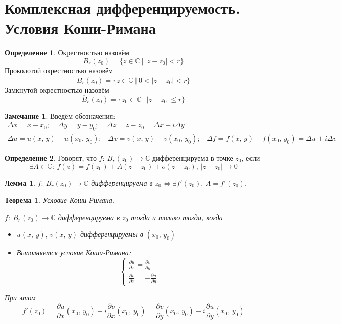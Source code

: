 \documentclass[a4paper,12pt]{article}
\renewcommand{\leq}{\ensuremath{\leqslant}}
\theoremstyle{plain}
\newtheorem{theorem}{Теорема}[section]
\newtheorem{lemma}{Лемма}[section]
\theoremstyle{definition}
\newtheorem{definition}{Определение}[section]
\newtheorem*{note}{Замечание}
\theoremstyle{remark}
\begin{document}
\tableofcontents
\newpage

\section{Комплексная дифференцируемость. Условия Коши-Римана}
\begin{definition}
	Окрестностью назовём
	\[
		B_r(z_0) = \{z \in \mathbb{C} \:\vert\: \vert z - z_0\vert < r\}
	\]
	Проколотой окрестностью назовём
	\[
		\dot{B}_r(z_0) = \{z \in \mathbb{C} \:\vert\: 0 < \vert z - z_0\vert < r\}
	\]
	Замкнутой окрестностью назовём
	\[
		\overline{B}_r(z_0) = \{z_0 \in \mathbb{C} \:\vert\: \vert z - z_0\vert \leq r\}
	\]
\end{definition}

\begin{note}
	Введём обозначения:
	\begin{align*}
		\Delta x = x - x_0 ;\;\;\;\; \Delta y = y - y_0 ;\;\;\;\; \Delta z = z - z_0 = \Delta x + i\Delta y \\
		\Delta u = u(x,\,y) - u(x_0,\,y_0);\;\;\; \Delta v = v(x,\,y) - v(x_0,\, y_0) ;\;\;\; \Delta f = f(x,\, y) - f(x_0,\, y_0) = \Delta u + i\Delta v
	\end{align*}
\end{note}

\begin{definition}
	Говорят, что $f :\: B_r(z_0) \to \mathbb{C}$ дифференцируема в точке $z_0$, если
	\[
		\exists A \in \mathbb{C} :\: f(z) = f(z_0) + A(z - z_0) + o(z - z_0),\, \vert z - z_0\vert \to 0
	\]
\end{definition}

\begin{lemma}
	$f :\: B_r(z_0) \to \mathbb{C}$ дифференцируема в $z_0 \Leftrightarrow \exists f'(z_0),\, A = f'(z_0)$.
\end{lemma}

\begin{theorem}
	Условие Коши-Римана.

	$f :\: B_r(z_0) \to \mathbb{C}$ дифференцируема в $z_0$ тогда и только тогда, когда
	\begin{itemize}
		\item $u(x,\, y),\, v(x,\, y)$ дифференцируемы в $(x_0,\, y_0)$
		\item Выполняется условие Коши-Римана:
		      \[
			      \begin{cases}
				      \frac{\partial u}{\partial x} = \frac{\partial v}{\partial y} \\
				      \frac{\partial v}{\partial x} = -\frac{\partial u}{\partial y}
			      \end{cases}
		      \]
	\end{itemize}
	При этом
	\[
		f'(z_0) = \frac{\partial u}{\partial x}(x_0,\, y_0) + i\frac{\partial v}{\partial x}(x_0,\, y_0) = \frac{\partial v}{\partial y}(x_0,\, y_0) - i\frac{\partial u}{\partial y}(x_0,\, y_0)
	\]
\end{theorem}
\end{document}
